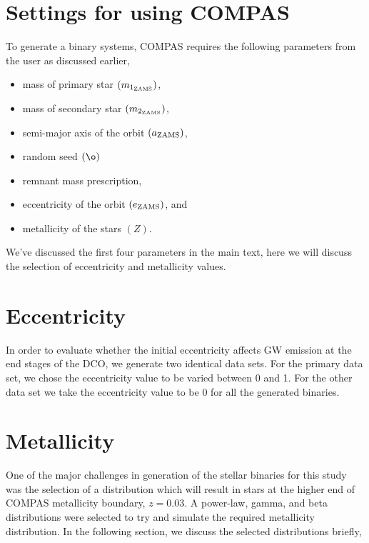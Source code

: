 \section{Settings for using COMPAS}
\label{sec:appA}
To generate a binary systems, COMPAS requires the following parameters from the user as discussed earlier,
\begin{itemize}
    \item mass of primary star $(m_{1_{\text{ZAMS}}})$,
    \item mass of secondary star $(m_{2_{\text{ZAMS}}})$,
    \item semi-major axis of the orbit $(a_{\text{ZAMS}})$,
    \item random seed $(\o)$
    \item remnant mass prescription,
    \item eccentricity of the orbit $(e_\text{ZAMS})$, and
    \item metallicity of the stars $\left(Z\right)$.
\end{itemize}

We've discussed the first four parameters in the main text, here we will discuss the selection of eccentricity and metallicity values.

\section*{Eccentricity}
\label{sec:eccentricity}

In order to evaluate whether the initial eccentricity affects GW emission at the end stages of the DCO, we generate two identical data sets.
For the primary data set, we chose the eccentricity value to be varied between 0 and 1.
For the other data set we take the eccentricity value to be 0 for all the generated binaries.

\section*{Metallicity}
\label{sec:metallicity}

One of the major challenges in generation of the stellar binaries for this study was the selection of a distribution which will result in stars at the higher end of COMPAS metallicity boundary, $z = 0.03$.
A power-law, gamma, and beta distributions were selected to try and simulate the required metallicity distribution.
In the following section, we discuss the selected distributions briefly,


